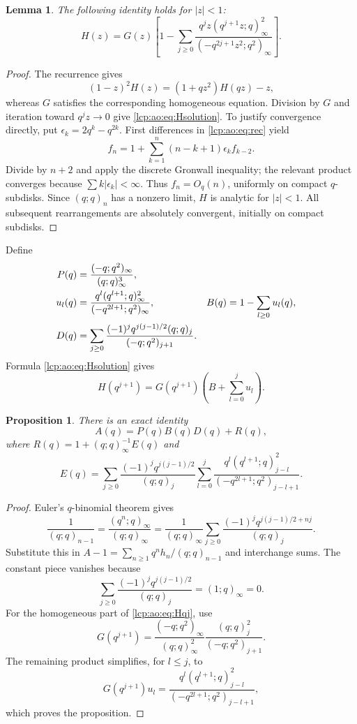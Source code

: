 \documentclass[11pt]{article}
\numberwithin{equation}{section}
\newtheorem{lemma}[theorem]{Lemma}
\newtheorem{proposition}[theorem]{Proposition}
\theoremstyle{definition}\newtheorem{definition}[theorem]{Definition}
\theoremstyle{remark}\newtheorem{remark}[theorem]{Remark}
\begin{document}
\begin{lemma}\label{lcp:ao:lem:H}
The following identity holds for $|z|<1$:
\begin{equation}\label{lcp:ao:eq:Hsolution}
 H(z)=G(z)\left[1-\sum_{j\ge0}\frac{q^jz(q^{j+1}z;q)_\infty^2}
 {(-q^{2j+1}z^2;q^2)_\infty}\right].
\end{equation}
\end{lemma}
\begin{proof}
The recurrence gives
\[
(1-z)^2H(z)=(1+qz^2)H(qz)-z,
\]
whereas $G$ satisfies the corresponding homogeneous equation. Division by $G$ and iteration toward $q^jz\to0$ give \eqref{lcp:ao:eq:Hsolution}. To justify convergence directly, put $\epsilon_k=2q^k-q^{2k}$. First differences in \eqref{lcp:ao:eq:rec} yield
\[
f_n=1+\sum_{k=1}^n(n-k+1)\epsilon_k f_{k-2}.
\]
Divide by $n+2$ and apply the discrete Gronwall inequality; the relevant product converges because $\sum k|\epsilon_k|<\infty$. Thus $f_n=O_q(n)$, uniformly on compact $q$-subdisks. Since $(q;q)_n$ has a nonzero limit, $H$ is analytic for $|z|<1$. All subsequent rearrangements are absolutely convergent, initially on compact subdisks.
\end{proof}
Define
\begin{align}\label{lcp:ao:eq:PBD}
 P(q)&=\frac{(-q;q^2)_\infty}{(q;q)_\infty^3},\notag\\
 u_l(q)&=\frac{q^l(q^{l+1};q)_\infty^2}{(-q^{2l+1};q^2)_\infty},
 &B(q)&=1-\sum_{l\ge0}u_l(q),\notag\\
 D(q)&=\sum_{j\ge0}\frac{(-1)^j q^{j(j-1)/2}(q;q)_j}{(-q;q^2)_{j+1}}.
\end{align}
Formula \eqref{lcp:ao:eq:Hsolution} gives
\begin{equation}\label{lcp:ao:eq:Hqj}
 H(q^{j+1})=G(q^{j+1})\left(B+\sum_{l=0}^j u_l\right).
\end{equation}

\begin{proposition}\label{lcp:ao:prop:split}
There is an exact identity
\begin{equation}\label{lcp:ao:eq:splitBD}
 A(q)=P(q)B(q)D(q)+R(q),
\end{equation}
where $R(q)=1+(q;q)_\infty^{-1}E(q)$ and
\begin{equation}\label{lcp:ao:eq:E}
 E(q)=\sum_{j\ge0}\frac{(-1)^j q^{j(j-1)/2}}{(q;q)_j}
 \sum_{l=0}^j
 \frac{q^l(q^{l+1};q)_{j-l}^2}{(-q^{2l+1};q^2)_{j-l+1}}.
\end{equation}
\end{proposition}
\begin{proof}
Euler's $q$-binomial theorem gives
\[
\frac1{(q;q)_{n-1}}=\frac{(q^n;q)_\infty}{(q;q)_\infty}
=\frac1{(q;q)_\infty}\sum_{j\ge0}
\frac{(-1)^jq^{j(j-1)/2+nj}}{(q;q)_j}.
\]
Substitute this in $A-1=\sum_{n\ge1}q^nh_n/(q;q)_{n-1}$ and interchange sums. The constant piece vanishes because
\[
\sum_{j\ge0}\frac{(-1)^jq^{j(j-1)/2}}{(q;q)_j}=(1;q)_\infty=0.
\]
For the homogeneous part of \eqref{lcp:ao:eq:Hqj}, use
\[
G(q^{j+1})=\frac{(-q;q^2)_\infty}{(q;q)_\infty^2}
\frac{(q;q)_j^2}{(-q;q^2)_{j+1}}.
\]
The remaining product simplifies, for $l\le j$, to
\[
G(q^{j+1})u_l=
\frac{q^l(q^{l+1};q)_{j-l}^2}{(-q^{2l+1};q^2)_{j-l+1}},
\]
which proves the proposition.
\end{proof}
\end{document}
